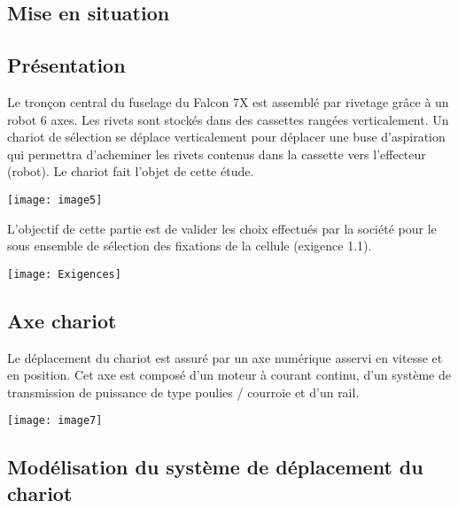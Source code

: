 \def\columnseprulecolor{\color{bleuxp}}
\setlength{\columnseprule}{0.4pt} 
\setcounter{numques}{0}
\begin{multicols}{2}
\section*{Mise en situation}
\ifprof
\else

\subsection*{Présentation}
Le tronçon central du fuselage du Falcon 7X est assemblé par rivetage grâce à un robot 6 axes. Les rivets sont stockés dans des cassettes rangées verticalement. Un chariot de sélection se déplace verticalement pour déplacer une buse d'aspiration qui permettra d'acheminer les rivets contenus dans la cassette vers l'effecteur (robot). Le chariot fait l'objet de cette étude.

\begin{center}
\texttt{[image: image5]}
\end{center} 

 
L'objectif de cette partie est de valider les choix effectués par la société pour le sous ensemble de sélection des fixations de la cellule (exigence 1.1).

\vfill

\begin{center}
\texttt{[image: Exigences]}
\end{center} 




 
\subsection*{Axe chariot}
Le déplacement du chariot est assuré par un axe numérique asservi en vitesse et en position. Cet axe est composé d'un moteur à courant continu, d'un système de transmission de puissance de type poulies / courroie et d'un rail.
 
\begin{center}
\texttt{[image: image7]}
\end{center} 


\subsection*{Modélisation du système de déplacement du chariot}


\end{multicols}
